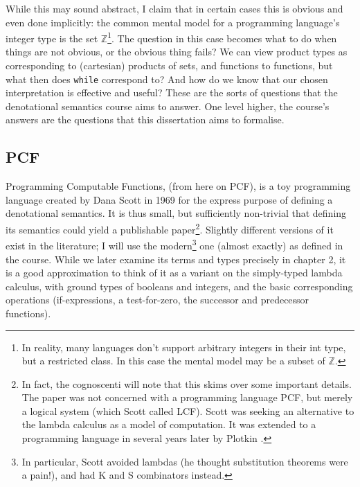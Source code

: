 \documentclass[12pt,a4paper,twoside,openright]{report}
\begin{document}
While this may sound abstract, I claim that in certain cases this is obvious and even done implicitly: the common mental model for a programming language's integer type is the set $\mathbb{Z}$\footnote{In reality, many languages don't support arbitrary integers in their int type, but a restricted class. In this case the mental model may be a subset of $\mathbb{Z}$.}. The question in this case becomes what to do when things are not obvious, or the obvious thing fails? We can view product types as corresponding to (cartesian) products of sets, and functions to functions, but what then does \texttt{while} correspond to? And how do we know that our chosen interpretation is effective and useful? These are the sorts of questions that the denotational semantics course \cite{Course} aims to answer. One level higher, the course's answers are the questions that this dissertation aims to formalise. 
\subsection{PCF}
Programming Computable Functions, (from here on PCF), is a toy programming language created by Dana Scott in 1969 \cite{Scott} for the express purpose of defining a denotational semantics. It is thus small, but sufficiently non-trivial that defining its semantics could yield a publishable paper\footnote{In fact, the cognoscenti will note that this skims over some important details. The paper was not concerned with a programming language PCF, but merely a logical system (which Scott called LCF). Scott was seeking an alternative to the lambda calculus as a model of computation. It was extended to a programming language in several years later by Plotkin \cite{Plotkin}.}. Slightly different versions of it exist in the literature; I will use the modern\footnote{In particular, Scott avoided lambdas (he thought substitution theorems were a pain!), and had K and S combinators instead.} one (almost exactly) as defined in the course. While we later examine its terms and types precisely in chapter 2, it is a good approximation to think of it as a variant on the simply-typed lambda calculus, with ground types of booleans and integers, and the basic corresponding operations (if-expressions, a test-for-zero, the successor and predecessor functions). 
\end{document}
